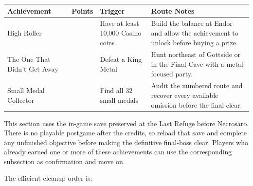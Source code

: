 \documentclass[
  american,
  10pt,
  letterpaper,
  oneside,
  open=any]{scrreprt}
\newcounter{none} %
\newenvironment{guidetable}{%
  \small\setstretch{1.0}%
  \setlength{\tabcolsep}{4pt}%
  \setlength{\LTpre}{8pt}\setlength{\LTpost}{10pt}%
  \renewcommand{\arraystretch}{1.16}%
}{ }
\begin{document}
\begin{guidetable}

{\def\LTcaptype{none} %
\begin{longtable}[]{@{}
  >{\raggedright\arraybackslash}p{}
  >{\raggedleft\arraybackslash}p{}
  >{\raggedright\arraybackslash}p{}
  >{\raggedright\arraybackslash}p{}@{}}
\toprule\noalign{}
\begin{minipage}[b]{\linewidth}\raggedright
\color{GuideGreen}\bfseries Achievement
\end{minipage} & \begin{minipage}[b]{\linewidth}\raggedleft
\color{GuideGreen}\bfseries Points
\end{minipage} & \begin{minipage}[b]{\linewidth}\raggedright
\color{GuideGreen}\bfseries Trigger
\end{minipage} & \begin{minipage}[b]{\linewidth}\raggedright
\color{GuideGreen}\bfseries Route Notes
\end{minipage} \\
\midrule\noalign{}
\endhead
\bottomrule\noalign{}
\endlastfoot
High Roller & 5 & Have at least 10,000 Casino coins & Build the balance
at Endor and allow the achievement to unlock before buying a prize. \\
The One That Didn't Get Away & 5 & Defeat a King Metal & Hunt northeast
of Gottside or in the Final Cave with a metal-focused party. \\
Small Medal Collector & 50 & Find all 32 small medals & Audit the
numbered route and recover every available omission before the final
clear. \\
\end{longtable}
}

\end{guidetable}

This section uses the in-game save preserved at the Last Refuge before
Necrosaro. There is no playable postgame after the credits, so reload
that save and complete any unfinished objective before making the
definitive final-boss clear. Players who already earned one or more of
these achievements can use the corresponding subsection as confirmation
and move on.

The efficient cleanup order is:
\end{document}
